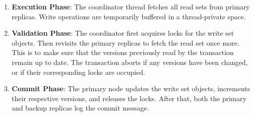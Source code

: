 \begin{enumerate}
    
    \item \textbf{Execution Phase}: The coordinator thread fetches all read sets from primary replicas. Write operations are temporarily buffered in a thread-private space. 
    
    \item \textbf{Validation Phase}: The coordinator first acquires locks for the write set objects. Then revisits the primary replicas to fetch the read set once more. This is to make sure that the versions previously read by the transaction remain up to date. The transaction aborts if any versions have been changed, or if their corresponding locks are occupied. 
    
    
    \item \textbf{Commit Phase}: The primary node updates the write set objects, increments their respective versions, and releases the locks. After that, both the primary and backup replicas log the commit message. 
    
    
    
    
    
\end{enumerate}



